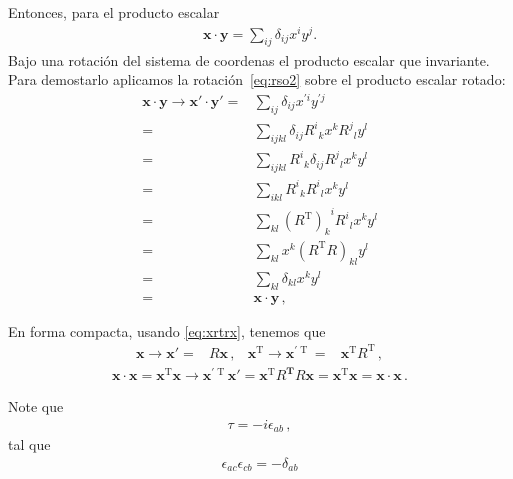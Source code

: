 Entonces, para el producto escalar
\begin{align}
  \boldsymbol{x}\cdot \boldsymbol{y}=\sum_{ij}\delta_{ij} x^i y^j. 
\end{align}
Bajo una rotación del sistema de coordenas el producto escalar que invariante. Para demostarlo aplicamos la rotación~\eqref{eq:rso2} sobre el producto escalar rotado:
\begin{align}
  \boldsymbol{x}\cdot \boldsymbol{y}\to  \boldsymbol{x}'\cdot \boldsymbol{y}'
                     =&\sum_{ij} \delta_{ij} x^{\prime i}  y^{\prime j} \nonumber\\
                     =&\sum_{ijkl}\delta_{ij} {R^i}_k x^{k}  {R^j}_l y^{l} \nonumber\\
                     =&\sum_{ijkl} {R^i}_k \delta_{ij} {R^j}_l  x^{k}  y^{l} \nonumber\\
  =&\sum_{ikl} {R^i}_k  {R^i}_l  x^{k}  y^{l} \nonumber\\
  \label{eq:xrtrx}
                     =&\sum_{kl}  {\left( R^{\text{T}} \right)_k}^i  {R^i}_l  x^{k}  y^{l} \\
  =&\sum_{kl} x^{k}  \left( R^{\text{T}}R \right)_{kl}      y^{l} \nonumber\\
  =&\sum_{kl}  \delta_{kl}    x^{k}  y^{l} \nonumber\\
    =& \boldsymbol{x}\cdot \boldsymbol{y}\,,
\end{align}

En forma compacta, usando \eqref{eq:xrtrx}, tenemos que
\begin{align}
  \boldsymbol{x}\to \boldsymbol{x}'=&R \boldsymbol{x}\,,&
  \boldsymbol{x}^{\operatorname{T}}\to \boldsymbol{x}^{\prime {\operatorname{T}}}=& \boldsymbol{x}^{\operatorname{T}} R^{\operatorname{T}}\,,
\end{align}
\begin{align}
  \label{eq:psso2}
  \boldsymbol{x}\cdot \boldsymbol{x}= \boldsymbol{x}^{\operatorname{T}} \boldsymbol{x}\to \boldsymbol{x}^{\prime\operatorname{T}} \boldsymbol{x}'
  =\boldsymbol{x}^{\operatorname{T}}R^{\boldsymbol{T}} R \boldsymbol{x}=\boldsymbol{x}^{\operatorname{T}} \boldsymbol{x}=  \boldsymbol{x}\cdot \boldsymbol{x}\,.
\end{align}


Note que
\begin{align*}
\tau=-i \epsilon_{ab}\,, 
\end{align*}
tal que
\begin{align*}
\epsilon_{ac}\epsilon_{cb}=-\delta_{ab}
\end{align*}



